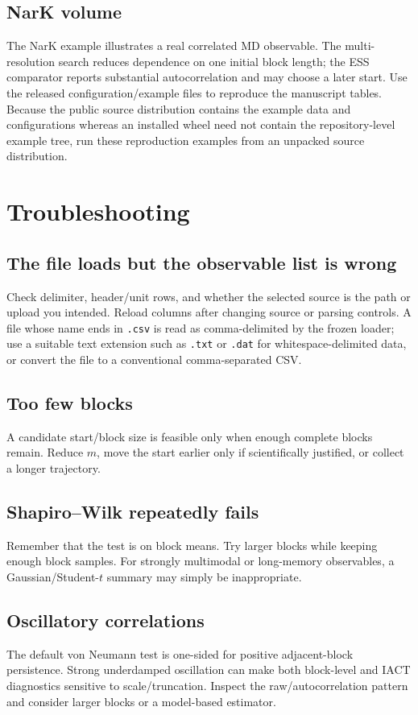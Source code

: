 \documentclass[11pt,oneside]{report}
\begin{document}
\section{NarK volume}
The NarK example illustrates a real correlated MD observable. The multi-resolution search reduces dependence on one initial block length; the ESS comparator reports substantial autocorrelation and may choose a later start. Use the released configuration/example files to reproduce the manuscript tables.  Because the public source distribution contains the example data and configurations whereas an installed wheel need not contain the repository-level example tree, run these reproduction examples from an unpacked source distribution.

\chapter{Troubleshooting}
\section{The file loads but the observable list is wrong}
Check delimiter, header/unit rows, and whether the selected source is the path or upload you intended. Reload columns after changing source or parsing controls.  A file whose name ends in \texttt{.csv} is read as comma-delimited by the frozen loader; use a suitable text extension such as \texttt{.txt} or \texttt{.dat} for whitespace-delimited data, or convert the file to a conventional comma-separated CSV.

\section{Too few blocks}
A candidate start/block size is feasible only when enough complete blocks remain. Reduce $m$, move the start earlier only if scientifically justified, or collect a longer trajectory.

\section{Shapiro--Wilk repeatedly fails}
Remember that the test is on block means. Try larger blocks while keeping enough block samples. For strongly multimodal or long-memory observables, a Gaussian/Student-$t$ summary may simply be inappropriate.

\section{Oscillatory correlations}
The default von Neumann test is one-sided for positive adjacent-block persistence. Strong underdamped oscillation can make both block-level and IACT diagnostics sensitive to scale/truncation. Inspect the raw/autocorrelation pattern and consider larger blocks or a model-based estimator.
\end{document}

